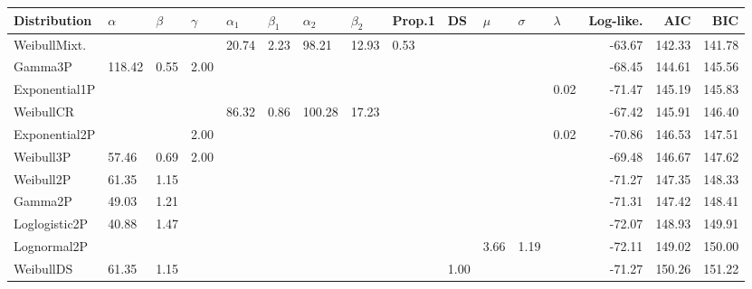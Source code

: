 \documentclass[a4, 11pt]{article}
\theoremstyle{definition}
\theoremstyle{remark}
\begin{document}
   \begin{table}[H]
       \tiny
       \centering
       \begin{tabular}{|l|l|l|l|l|l|l|l|l|l|l|l|l|r|r|r|}
           \hline
           Distribution &
           $\alpha$ &
           $\beta$ &
           $\gamma$ &
           $\alpha_1$ &
           $\beta_1$ &
           $\alpha_2$ &
           $\beta_2$ &
           Prop.1 &
           DS &
           $\mu$ &
           $\sigma$ &
           $\lambda$ &
           \textbf{Log-like.} &
           \textbf{AIC} &
           \textbf{BIC} \\ \hline
           WeibullMixt. &        &      &      & 20.74 & 2.23 & 98.21  & 12.93 & 0.53 &      &       &       &      & -63.67 & 142.33 & 141.78 \\ \hline
           Gamma3P        & 118.42 & 0.55 & 2.00 &       &      &        &       &      &      &       &       &      & -68.45 & 144.61 & 145.56 \\ \hline
           Exponential1P  &        &      &      &       &      &        &       &      &      &       &       & 0.02 & -71.47 & 145.19 & 145.83 \\ \hline
           WeibullCR      &        &      &      & 86.32 & 0.86 & 100.28 & 17.23 &      &      &       &       &      & -67.42 & 145.91 & 146.40 \\ \hline
           Exponential2P  &        &      & 2.00 &       &      &        &       &      &      &       &       & 0.02 & -70.86 & 146.53 & 147.51 \\ \hline
           Weibull3P      & 57.46  & 0.69 & 2.00 &       &      &        &       &      &      &       &       &      & -69.48 & 146.67 & 147.62 \\ \hline
           Weibull2P      & 61.35  & 1.15 &      &       &      &        &       &      &      &       &       &      & -71.27 & 147.35 & 148.33 \\ \hline
           Gamma2P        & 49.03  & 1.21 &      &       &      &        &       &      &      &       &       &      & -71.31 & 147.42 & 148.41 \\ \hline
           Loglogistic2P  & 40.88  & 1.47 &      &       &      &        &       &      &      &       &       &      & -72.07 & 148.93 & 149.91 \\ \hline
           Lognormal2P    &        &      &      &       &      &        &       &      &      & 3.66  & 1.19  &      & -72.11 & 149.02 & 150.00 \\ \hline
           WeibullDS      & 61.35  & 1.15 &      &       &      &        &       &      & 1.00 &       &       &      & -71.27 & 150.26 & 151.22 \\ \hline

\end{tabular}
\end{table}
\end{document}
